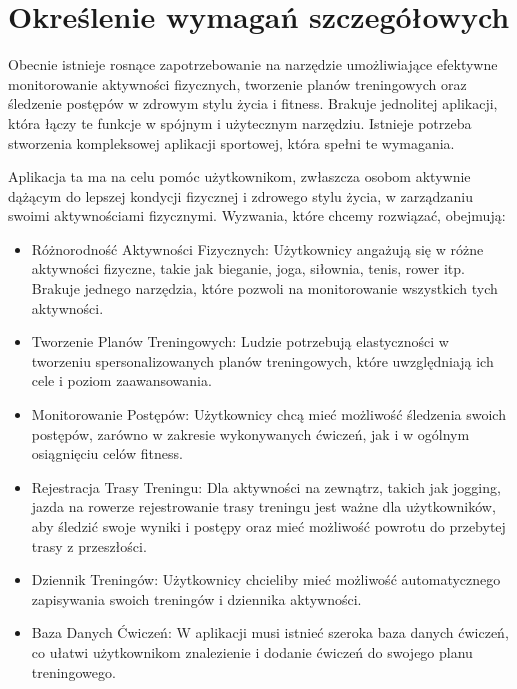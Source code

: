\newpage
\section{Określenie wymagań szczegółowych}		%

Obecnie istnieje rosnące zapotrzebowanie na narzędzie umożliwiające efektywne monitorowanie aktywności fizycznych, tworzenie planów treningowych oraz śledzenie postępów w zdrowym stylu życia i fitness. Brakuje jednolitej aplikacji, która łączy te funkcje w spójnym i użytecznym narzędziu. Istnieje potrzeba stworzenia kompleksowej aplikacji sportowej, która spełni te wymagania.

Aplikacja ta ma na celu pomóc użytkownikom, zwłaszcza osobom aktywnie dążącym do lepszej kondycji fizycznej i zdrowego stylu życia, w zarządzaniu swoimi aktywnościami fizycznymi. Wyzwania, które chcemy rozwiązać, obejmują:

\begin{itemize}
    \item Różnorodność Aktywności Fizycznych: Użytkownicy angażują się w różne aktywności fizyczne, takie jak bieganie, joga, siłownia, tenis, rower itp. Brakuje jednego narzędzia, które pozwoli na monitorowanie wszystkich tych aktywności.

    \item Tworzenie Planów Treningowych: Ludzie potrzebują elastyczności w tworzeniu spersonalizowanych planów treningowych, które uwzględniają ich cele i poziom zaawansowania.

    \item Monitorowanie Postępów: Użytkownicy chcą mieć możliwość śledzenia swoich postępów, zarówno w zakresie wykonywanych ćwiczeń, jak i w ogólnym osiągnięciu celów fitness.

    \item Rejestracja Trasy Treningu: Dla aktywności na zewnątrz, takich jak jogging, jazda na rowerze rejestrowanie trasy treningu jest ważne dla użytkowników, aby śledzić swoje wyniki i postępy oraz mieć możliwość powrotu do przebytej trasy z przeszłości.

    \item Dziennik Treningów: Użytkownicy chcieliby mieć możliwość automatycznego zapisywania swoich treningów i dziennika aktywności.

    \item Baza Danych Ćwiczeń: W aplikacji musi istnieć szeroka baza danych ćwiczeń, co ułatwi użytkownikom znalezienie i dodanie ćwiczeń do swojego planu treningowego.
\end{itemize}

